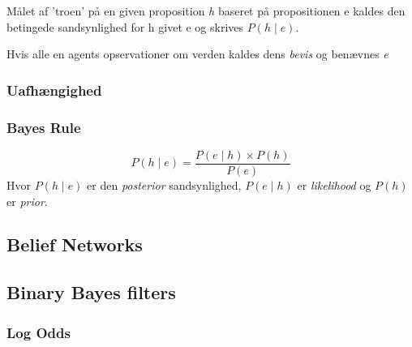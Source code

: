 Målet af 'troen' på en given proposition \emph{h} baseret på propositionen e kaldes
den betingede sandsynlighed for h givet e og skrives $P(h \mid e)$.

Hvis alle en agents opservationer om verden kaldes dens \emph{bevis} og benævnes \emph{e}




\subsubsection{Uafhængighed}



\subsubsection{Bayes Rule}

$$P(h \mid e) = \frac{P(e \mid h) \times P(h)}{P(e)}$$
Hvor $P(h \mid e)$ er den \emph{posterior} sandsynlighed, $P(e \mid h)$ er \emph{likelihood} og $P(h)$ er \emph{prior}. 


\subsection{Belief Networks}







\subsection{Binary Bayes filters}


\subsubsection{Log Odds}



